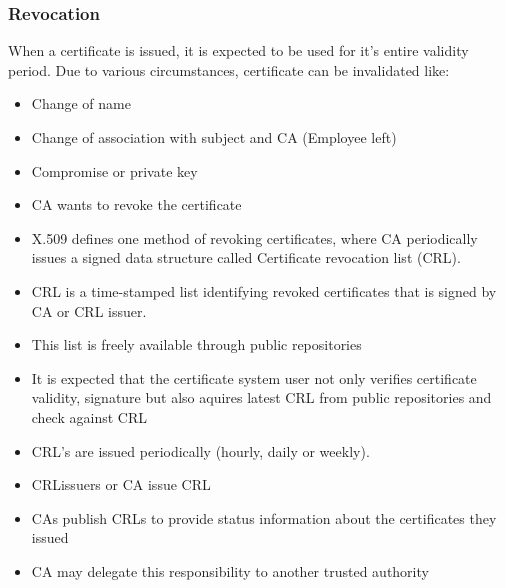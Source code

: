 \documentclass[12pt]{report}
\begin{document}
    \subsubsection{Revocation}
        When a certificate is issued, it is expected to be used for it's entire validity period. Due to various circumstances, certificate can be invalidated like:
        \begin{itemize}
            \item Change of name
            \item Change of association with subject and CA (Employee left)
            \item Compromise or private key
            \item CA wants to revoke the certificate
        \end{itemize}
        \begin{itemize}
            \item X.509 defines one method of revoking certificates, where CA periodically issues a signed data structure called Certificate revocation list (CRL).
            \item CRL is a time-stamped list identifying revoked certificates that is signed by CA or CRL issuer. 
            \item This list is freely available through public repositories
            \item It is expected that the certificate system user not only verifies certificate validity, signature but also aquires latest CRL from public repositories and check against CRL
            \item CRL's are issued periodically (hourly, daily or weekly). 
            \item CRLissuers or CA issue CRL
            \item CAs publish CRLs to provide status information about the certificates they issued
            \item CA may delegate this responsibility to another trusted authority
        \end{itemize}
\end{document}
